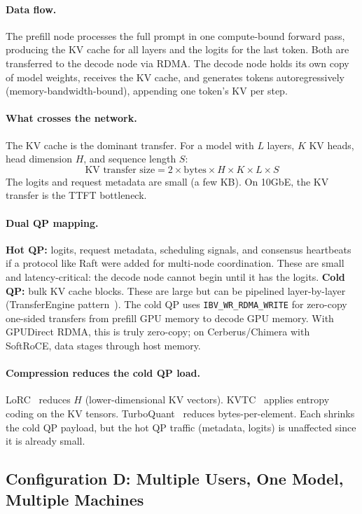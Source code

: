 \documentclass[11pt]{article}
\begin{document}
\paragraph{Data flow.}
The prefill node processes the full prompt in one compute-bound forward pass, producing the KV cache for all layers and the logits for the last token. Both are transferred to the decode node via RDMA. The decode node holds its own copy of model weights, receives the KV cache, and generates tokens autoregressively (memory-bandwidth-bound), appending one token's KV per step.

\paragraph{What crosses the network.}
The KV cache is the dominant transfer. For a model with $L$ layers, $K$ KV heads, head dimension $H$, and sequence length $S$:
\[
\text{KV transfer size} = 2 \times \text{bytes} \times H \times K \times L \times S
\]
The logits and request metadata are small (a few KB). On 10GbE, the KV transfer is the TTFT bottleneck.

\paragraph{Dual QP mapping.}
\textbf{Hot QP:} logits, request metadata, scheduling signals, and consensus heartbeats if a protocol like Raft were added for multi-node coordination. These are small and latency-critical: the decode node cannot begin until it has the logits. \textbf{Cold QP:} bulk KV cache blocks. These are large but can be pipelined layer-by-layer (TransferEngine pattern~\cite{chen2025transferengine}). The cold QP uses \texttt{IBV\_WR\_RDMA\_WRITE} for zero-copy one-sided transfers from prefill GPU memory to decode GPU memory. With GPUDirect RDMA, this is truly zero-copy; on Cerberus/Chimera with SoftRoCE, data stages through host memory.

\paragraph{Compression reduces the cold QP load.}
LoRC~\cite{zhang2024lorc} reduces $H$ (lower-dimensional KV vectors). KVTC~\cite{kvtc2024} applies entropy coding on the KV tensors. TurboQuant~\cite{turboquant2026} reduces bytes-per-element. Each shrinks the cold QP payload, but the hot QP traffic (metadata, logits) is unaffected since it is already small.

\subsection{Configuration D: Multiple Users, One Model, Multiple Machines}
\end{document}
